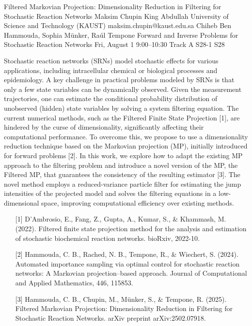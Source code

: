 \begin{talk}
  {Filtered Markovian Projection: Dimensionality Reduction in Filtering for Stochastic Reaction Networks}%
  {Maksim Chupin}%
  {King Abdullah University of Science and Technology (KAUST)}%
  {maksim.chupin@kaust.edu.sa}%
  {Chiheb Ben Hammouda, Sophia M\"{u}nker, Ra\'{u}l Tempone}%
  {Forward and Inverse Problems for Stochastic Reaction Networks}%
  {Fri, August 1 9:00–10:30 Track A}%
  {S28-1}%
  {S28}%
				
			
Stochastic reaction networks (SRNs) model stochastic effects for various applications, including intracellular chemical or biological processes and epidemiology. A key challenge in practical problems modeled by SRNs is that only a few state variables can be dynamically observed. Given the measurement trajectories, one can estimate the conditional probability distribution of unobserved (hidden) state variables by solving a system filtering equation. The current numerical methods, such as the Filtered Finite State Projection [1], are hindered by the curse of dimensionality, significantly affecting their computational performance. To overcome this, we propose to use a dimensionality reduction technique based on the Markovian projection (MP), initially introduced for forward problems [2]. In this work, we explore how to adapt the existing MP approach to the filtering problem and introduce a novel version of the MP, the Filtered MP, that guarantees the consistency of the resulting estimator [3]. The novel method employs a reduced-variance particle filter for estimating the jump intensities of the projected model and solves the filtering equations in a low-dimensional space, improving computational efficiency over existing methods.





\medskip

\begin{enumerate}
	\item[{[1]}] D’Ambrosio, E., Fang, Z., Gupta, A., Kumar, S., \& Khammash, M. (2022). Filtered finite state projection method for the analysis and estimation of stochastic biochemical reaction networks. bioRxiv, 2022-10.
	\item[{[2]}] Hammouda, C. B., Rached, N. B., Tempone, R., \& Wiechert, S. (2024). Automated importance sampling via optimal control for stochastic reaction networks: A Markovian projection–based approach. Journal of Computational and Applied Mathematics, 446, 115853.
    \item [{[3]}] Hammouda, C. B., Chupin, M., Münker, S., \& Tempone, R. (2025). Filtered Markovian Projection: Dimensionality Reduction in Filtering for Stochastic Reaction Networks. arXiv preprint arXiv:2502.07918.
\end{enumerate}


\end{talk}

